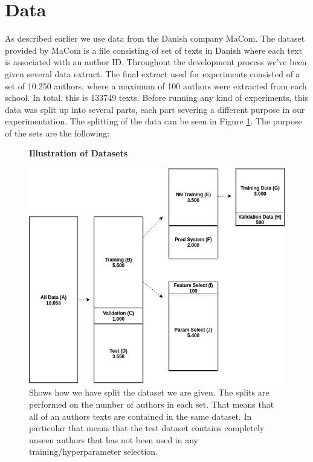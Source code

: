\section{Data} \label{sec:data}

As described earlier we use data from the Danish company MaCom. The dataset
provided by MaCom is a file consisting of set of texts in Danish where each text
is associated with an author ID. Throughout the development process we've been
given several data extract. The final extract used for experiments consisted of
a set of 10.250 authors, where a maximum of 100 authors were extracted from each
school. In total, this is 133749 texts. Before running any kind of experiments,
this data was split up into several parts, each part severing a different
purpose in our experimentation. The splitting of the data can be seen in Figure
\ref{fig:data_split}. The purpose of the sets are the following:

\begin{figure}
    \centering
    \textbf{Illustration of Datasets}\par\medskip
    \includegraphics[width=.8\textwidth]{./pictures/data/Data.png}
    \caption{Shows how we have split the dataset we are given. The splits are
        performed on the number of authors in each set. That means that all of
        an authors texts are contained in the same dataset. In particular that
        means that the test dataset contains completely unseen authors that has
        not been used in any training/hyperparameter selection.}
    \label{fig:data_split}
\end{figure}

